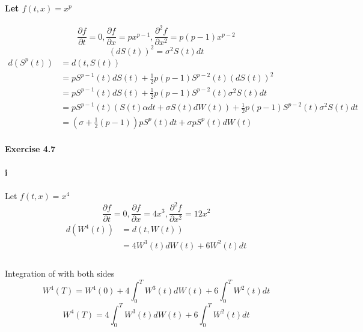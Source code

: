\documentclass{article}
\begin{document}
\paragraph{Let $f(t,x)=x^p$}
\begin{displaymath}
   \frac{\partial f}{\partial t}=0,\frac{\partial f}{\partial x}=px^{p-1},\frac{\partial^2 f}{\partial x^2}=p(p-1)x^{p-2}
\end{displaymath}
\begin{displaymath}
  (dS(t))^2=\sigma^2S(t)dt
\end{displaymath}
\begin{align*}
  d(S^p(t)) & = d(t,S(t))\\
   & =pS^{p-1}(t)dS(t)+\frac{1}{2}p(p-1)S^{p-2}(t)(dS(t))^2 \\
   & =pS^{p-1}(t)dS(t)+\frac{1}{2}p(p-1)S^{p-2}(t)\sigma^2S(t)dt \\
    & = pS^{p-1}(t)(S(t)\alpha dt+\sigma S(t)dW(t))+\frac{1}{2}p(p-1)S^{p-2}(t)\sigma^2S(t)dt \\
   & =(\sigma+\frac{1}{2}(p-1))pS^{p}(t)dt+\sigma pS^{p}(t)dW(t)
\end{align*}
\paragraph{Exercise 4.7 }
\paragraph{i}
\paragraph{}{Let $f(t,x)=x^4$}
\begin{displaymath}
 \frac{\partial f}{\partial t}=0,\frac{\partial f}{\partial x}=4x^3,\frac{\partial^2 f}{\partial x^2}=12x^2
\end{displaymath}
\begin{align*}
  d(W^4(t)) & = d(t,W(t))\\
   & =4W^3(t)dW(t)+6W^2(t)dt \\
\end{align*}
\paragraph{}{Integration of with both sides}
\begin{displaymath}
  W^4(T)=W^4(0)+4\int_{0}^{T}W^3(t)dW(t)+6\int_{0}^{T}W^2(t)dt
\end{displaymath}
\begin{displaymath}
  W^4(T)=4\int_{0}^{T}W^3(t)dW(t)+6\int_{0}^{T}W^2(t)dt
\end{displaymath}
\end{document}
